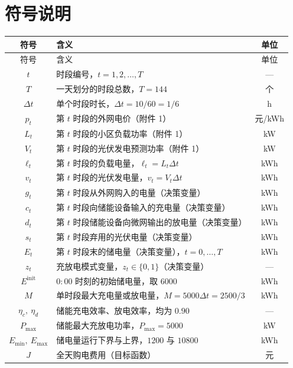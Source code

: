 \documentclass[withoutpreface,bwprint]{cumcmthesis}
\begin{document}
\section{符号说明}

\begingroup
\def\LTcaptype{}
\begin{longtable}{clc}
  \toprule
  符号 & 含义 & 单位 \\
  \midrule
  \endfirsthead
  \toprule
  符号 & 含义 & 单位 \\
  \midrule
  \endhead
  \bottomrule
  \endlastfoot
  $t$ & 时段编号，$t = 1, 2, \dots, T$ & --- \\
  $T$ & 一天划分的时段总数，$T = 144$ & 个 \\
  $\Delta t$ & 单个时段时长，$\Delta t = 10/60 = 1/6$ & h \\
  $p_t$ & 第 $t$ 时段的外网电价（附件 1） & 元/kWh \\
  $L_t$ & 第 $t$ 时段的小区负载功率（附件 1） & kW \\
  $V_t$ & 第 $t$ 时段的光伏发电预测功率（附件 1） & kW \\
  $\ell_t$ & 第 $t$ 时段的负载电量，$\ell_t = L_t \Delta t$ & kWh \\
  $v_t$ & 第 $t$ 时段的光伏发电量，$v_t = V_t \Delta t$ & kWh \\
  $g_t$ & 第 $t$ 时段从外网购入的电量（决策变量） & kWh \\
  $c_t$ & 第 $t$ 时段向储能设备输入的充电量（决策变量） & kWh \\
  $d_t$ & 第 $t$ 时段储能设备向微网输出的放电量（决策变量） & kWh \\
  $s_t$ & 第 $t$ 时段弃用的光伏电量（决策变量） & kWh \\
  $E_t$ & 第 $t$ 时段末的储电量（决策变量），$t = 0,\dots,T$ & kWh \\
  $z_t$ & 充放电模式变量，$z_t \in \{0,1\}$（决策变量） & --- \\
  $E^{\mathrm{init}}$ & $0{:}00$ 时刻的初始储电量，取 $6000$ & kWh \\
  $M$ & 单时段最大充电量或放电量，$M = 5000 \Delta t = 2500/3$ & kWh \\
  $\eta_c,\ \eta_d$ & 储能充电效率、放电效率，均为 $0.90$ & --- \\
  $P_{\max}$ & 储能最大充放电功率，$P_{\max} = 5000$ & kW \\
  $E_{\min},\ E_{\max}$ & 储电量运行下界与上界，$1200$ 与 $10800$ & kWh \\
  $J$ & 全天购电费用（目标函数） & 元 \\
\end{longtable}
\endgroup
\end{document}
